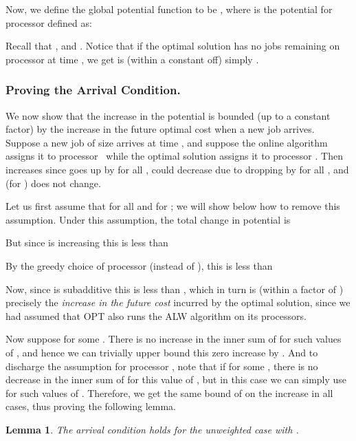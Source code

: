 \documentclass[11pt]{article}
\newtheorem{lemma}{Lemma}[section]
\newcommand{\opt}{\textrm{\sc OPT}\xspace}
\newcommand{\alw}{{\sf ALW}\xspace}
\begin{document}
Now, we define the
global potential function to be , where
 is the potential for processor  defined as:

 Recall that , and .
Notice that if the optimal solution has no jobs remaining on processor  at time
, we get  is (within a constant off) simply .


\subsubsection{Proving the Arrival Condition.}

We now show that the increase in the potential  is bounded (up to
a constant factor) by the increase in the future optimal cost when a new
job arrives. Suppose a new job of size  arrives at time , and suppose
 the online algorithm assigns it
to processor~ while the optimal solution assigns it to processor
. Then  increases since  goes up by  for all
,  could decrease due to  dropping by
 for all , and  (for ) does
not change.

Let us first assume that  for all  and for ; we will show below how to remove this
assumption. Under this assumption, the total change in potential 
is

But since  is increasing this is less than

By the greedy choice of processor  (instead of ), this is less
than

Now, since  is subadditive this is less than , which in
turn is (within a factor of ) precisely the \emph{increase in
  the future cost} incurred by the optimal solution, since we had
assumed that \opt also runs the \alw algorithm on its processors.

Now suppose  for some . There
is no increase in the inner sum of  for such values of , and
hence we can trivially upper bound this zero increase by . And to
discharge the assumption for processor , note that if  for some , there is no decrease in the inner sum of
 for this value of , but in this case we can simply use
 for such values of .
Therefore, we get the same bound of  on the increase in all
cases, thus proving the following lemma.
\begin{lemma}
  \label{dlem:arrival} The arrival condition holds for the unweighted
  case with .
\end{lemma}
\end{document}
